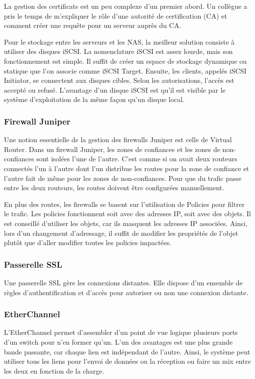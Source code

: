 La gestion des certificats est un peu complexe d'un premier abord.
Un collègue a pris le temps de m'expliquer le rôle d'une autorité de certification (CA) et comment créer une requête pour un serveur auprès du CA. 

Pour le stockage entre les serveurs et les NAS, la meilleur solution consiste à utiliser des disques iSCSI.
La nomenclature iSCSI est assez lourde, mais son fonctionnement est simple. 
Il suffit de créer un espace de stockage dynamique ou statique que l'on associe comme iSCSI Target. 
Ensuite, les clients, appelés iSCSI Initiator, se connectent aux disques cibles. 
Selon les autorisations, l'accès est accepté ou refusé.
L'avantage d'un disque iSCSI est qu'il est visible par le système d'exploitation de la même façon qu'un disque local. 

\subsubsection{Firewall Juniper}
Une notion essentielle de la gestion des firewalls Juniper est celle de Virtual Router.
Dans un firewall Juniper, les zones de confiances et les zones de non-confiances sont isolées l'une de l'autre.
C'est comme si on avait deux routeurs connectés l'un à l'autre dont l'un distribue les routes pour la zone de confiance et l'autre fait de même pour les zones de non-confiances.
Pour que du trafic passe entre les deux routeurs, les routes doivent être configurées manuellement.

En plus des routes, les firewalls se basent sur l'utilisation de Policies pour filtrer le trafic.
Les policies fonctionnent soit avec des adresses IP, soit avec des objets. 
Il est conseillé d'utiliser les objets, car ils masquent les adresses IP associées. 
Ainsi, lors d'un changement d'adressage, il suffit de modifier les propriétés de l'objet plutôt que d'aller modifier toutes les policies impactées.
\subsubsection{Passerelle SSL}
Une passerelle SSL gère les connexions distantes.
Elle dispose d'un ensemble de règles d'authentification et d'accès pour autoriser ou non une connexion distante.
 
\subsubsection{EtherChannel}
L'EtherChannel permet d'assembler d'un point de vue logique plusieurs ports d'un switch pour n'en former qu'un.
L'un des avantages est une plus grande bande passante, car chaque lien est indépendant de l'autre.
Ainsi, le système peut utiliser tous les liens pour l'envoi de données ou la réception ou faire un mix entre les deux en fonction de la charge. 



